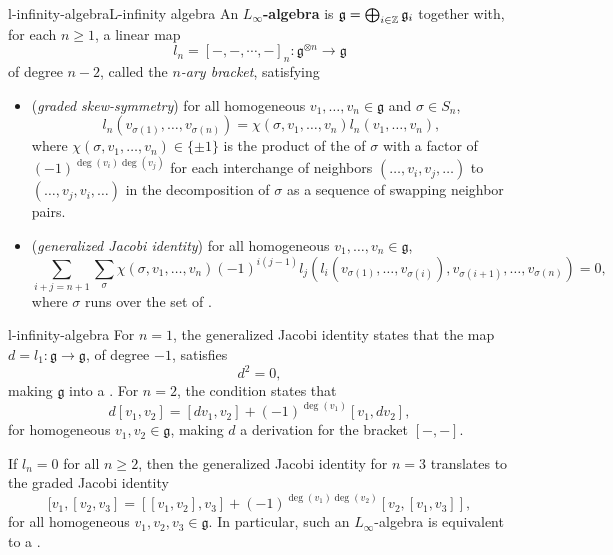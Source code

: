\begin{topic}{l-infinity-algebra}{L-infinity algebra}
    An \textbf{$L_\infty$-algebra} is   $\mathfrak{g} = \bigoplus_{i \in \mathbb{Z}} \mathfrak{g}_i$ together with, for each $n \ge 1$, a linear map
    \[ l_n = [-, -, \cdots, -]_n : \mathfrak{g}^{\otimes n} \to \mathfrak{g} \]
    of degree $n - 2$, called the \textit{$n$-ary bracket}, satisfying
    \begin{itemize}
        \item (\textit{graded skew-symmetry}) for all homogeneous $v_1, \ldots, v_n \in \mathfrak{g}$ and  $\sigma \in S_n$,
        \[ l_n(v_{\sigma(1)}, \ldots, v_{\sigma(n)}) = \chi(\sigma, v_1, \ldots, v_n) l_n(v_1, \ldots, v_n) , \]
        where $\chi(\sigma, v_1, \ldots, v_n) \in \{ \pm 1 \}$ is the product of the  of $\sigma$ with a factor of $(-1)^{\deg(v_i) \deg(v_j)}$ for each interchange of neighbors $(\ldots, v_i, v_j, \ldots)$ to $(\ldots, v_j, v_i, \ldots)$ in the decomposition of $\sigma$ as a sequence of swapping neighbor pairs.
        \item (\textit{generalized Jacobi identity}) for all homogeneous $v_1, \ldots, v_n \in \mathfrak{g}$,
        \[ \sum_{i + j = n + 1} \sum_{\sigma} \chi(\sigma, v_1, \ldots, v_n) (-1)^{i(j - 1)} l_j(l_i(v_{\sigma(1)}, \ldots, v_{\sigma(i)}), v_{\sigma(i + 1)}, \ldots, v_{\sigma(n)}) = 0 , \]
        where $\sigma$ runs over the set of .
    \end{itemize}
\end{topic}

\begin{example}{l-infinity-algebra}
    For $n = 1$, the generalized Jacobi identity states that the map $d = l_1 : \mathfrak{g} \to \mathfrak{g}$, of degree $-1$, satisfies
    \[ d^2 = 0 , \]
    making $\mathfrak{g}$ into a . For $n = 2$, the condition states that
    \[ d[v_1, v_2] = [dv_1, v_2] + (-1)^{\deg(v_1)} [v_1, dv_2] , \]
    for homogeneous $v_1, v_2 \in \mathfrak{g}$, making $d$ a derivation for the bracket $[-, -]$.
    
    If $l_n = 0$ for all $n \ge 2$, then the generalized Jacobi identity for $n = 3$ translates to the graded Jacobi identity
    \[ [v_1, [v_2, v_3] = [[v_1, v_2], v_3] + (-1)^{\deg(v_1) \deg(v_2)} [v_2, [v_1, v_3]] , \]
    for all homogeneous $v_1, v_2, v_3 \in \mathfrak{g}$. In particular, such an $L_\infty$-algebra is equivalent to a .
\end{example}

